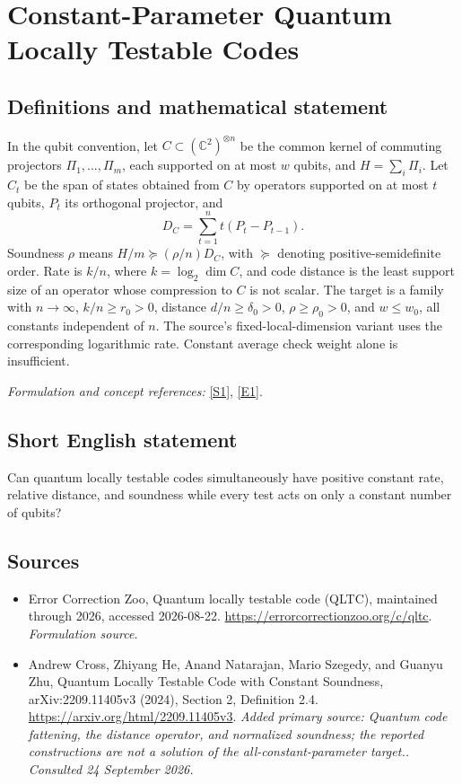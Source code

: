 \documentclass[11pt]{article}
\begin{document}
\section*{\texorpdfstring{Constant-Parameter Quantum Locally Testable Codes}{Constant-Parameter Quantum Locally Testable Codes}}\label{354}
\subsection{Definitions and mathematical statement}
In the qubit convention, let $C\subset({\mathbb{C}}^2)^{\otimes n}$ be the common kernel of commuting projectors $\Pi_1,\ldots,\Pi_m$, each supported on at most $w$ qubits, and $H=\sum_i\Pi_i$. Let $C_t$ be the span of states obtained from $C$ by operators supported on at most $t$ qubits, $P_t$ its orthogonal projector, and
\[
 D_C=\sum_{t=1}^n t(P_t-P_{t-1}).
\]
Soundness $\rho$ means $H/m\succeq(\rho/n)D_C$, with $\succeq$ denoting positive-semidefinite order. Rate is $k/n$, where $k=\log_2\dim C$, and code distance is the least support size of an operator whose compression to $C$ is not scalar. The target is a family with $n\to\infty$, $k/n\ge r_0>0$, distance $d/n\ge\delta_0>0$, $\rho\ge\rho_0>0$, and $w\le w_0$, all constants independent of $n$. The source's fixed-local-dimension variant uses the corresponding logarithmic rate. Constant average check weight alone is insufficient.
\par\smallskip\textit{Formulation and concept references:} \href{https://errorcorrectionzoo.org/c/qltc}{[S1]}, \href{https://arxiv.org/html/2209.11405v3}{[E1]}.

\subsection{Short English statement}
Can quantum locally testable codes simultaneously have positive constant rate, relative distance, and soundness while every test acts on only a constant number of qubits?
\subsection{Sources}
\begin{itemize}
\item[S1]Error Correction Zoo, Quantum locally testable code (QLTC), maintained through 2026, accessed 2026-08-22.
\url{https://errorcorrectionzoo.org/c/qltc}.
\textit{Formulation source.}
\item[E1]Andrew Cross, Zhiyang He, Anand Natarajan, Mario Szegedy, and Guanyu Zhu, Quantum Locally Testable Code with Constant Soundness, arXiv:2209.11405v3 (2024), Section 2, Definition 2.4.
\url{https://arxiv.org/html/2209.11405v3}.
\textit{Added primary source: Quantum code fattening, the distance operator, and normalized soundness; the reported constructions are not a solution of the all-constant-parameter target.. Consulted 24 September 2026.}
\end{itemize}
\end{document}
